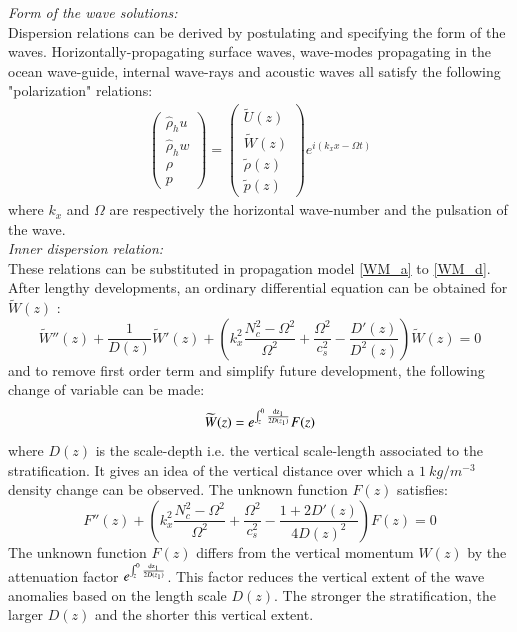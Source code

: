\documentclass[a4paper,11pt]{article}
\begin{document}
\textit{Form of the wave solutions:}\\
Dispersion relations can be derived by postulating and specifying the form of the waves. Horizontally-propagating surface waves, wave-modes propagating in the ocean wave-guide, internal wave-rays and acoustic waves all satisfy the following "polarization" relations:
\label{SubSectionPropag}
\begin{subequations}
  \begin{alignat}{2}
  \displaystyle
  \left(
  \begin{array}{c}
    \hat{\rho}_h u\\
    \hat{\rho}_h w\\
    \rho\\
    p
  \end{array}
  \right)
  =
  \left(
  \begin{array}{c}
    \widetilde{U}(z)\\
    \widetilde{W}(z)\\
    \widetilde{\rho}(z)\\
    \widetilde{p}(z)
  \end{array}
  \right)
  e^{i(k_xx-\Omega t)}
\end{alignat}
\end{subequations}
where $k_x$ and $\Omega$ are respectively the horizontal wave-number and the pulsation of the wave. \\

\textit{Inner dispersion relation:}\\
These relations can be substituted in propagation model \ref{WM_a} to \ref{WM_d}.  After lengthy developments, an ordinary differential equation can be obtained for $ \widetilde{W}(z)$ :
\begin{equation}
  \displaystyle
  \widetilde{W}''(z)+\frac{1}{D(z)}\widetilde{W}'(z)
  +
  \left(
  k_x^2\frac{N_c^2-\Omega^2}{\Omega^2}+\frac{\Omega^2}{c_s^2}
  -\frac{D'(z)}{D^2(z)}
  \right)
  \widetilde{W}(z)=0
  \label{eqwfirst}
\end{equation}
and to remove first order term and simplify future development, the following change of variable can be made:
\begin{equation}
  \displaystyle
  \widetilde{W}(z)=e^{\int_{z}^0{ \frac{\rm{d} z_1}{2D(z_1)} } }F(z)
  \label{CVF}
\end{equation}
where $D(z)$ is the scale-depth i.e. the vertical scale-length associated to the stratification. It gives an idea of the vertical distance over which a $1\ kg/m^{-3}$ density change can be observed.
The unknown function $F(z)$ satisfies:
\begin{equation}
  \displaystyle
  F''(z)
  +\left(
  k_x^2\frac{N_c^2-\Omega^2}{\Omega^2}
  +
  \frac{\Omega^2}{c_s^2}-\frac{1+2D'(z)}{4D(z)^2}
  \right)
  F(z)=0
  \label{eqF}
\end{equation}
The unknown function $F(z)$ differs from the vertical momentum $W(z)$ by the attenuation factor $e^{\int_{z}^0{ \frac{\rm{d} z_1}{2D(z_1)} } }$. This factor reduces the vertical extent of the wave anomalies based on the length scale $D(z)$. The stronger the stratification, the larger $D(z)$ and the shorter this vertical extent.\\
\end{document}
